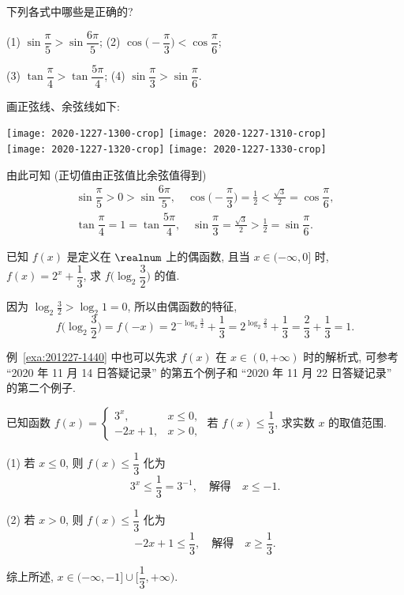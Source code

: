 \begin{example}
    下列各式中哪些是正确的?
    
    (1) $\sin\dfrac\pi5> \sin\dfrac{6\pi}5$;\quad 
    (2) $\cos\biggl(-\dfrac\pi3\biggr)< \cos\dfrac\pi6$;
    
    (3) $\tan\dfrac\pi4> \tan\dfrac{5\pi}4$;\quad 
    (4) $\sin\dfrac\pi3> \sin\dfrac\pi6$.
\end{example}
\begin{solution}
    画正弦线、余弦线如下:
    
    \begin{center}
        \texttt{[image: 2020-1227-1300-crop]}\qquad
        \texttt{[image: 2020-1227-1310-crop]}\\[5pt]
        \texttt{[image: 2020-1227-1320-crop]}\qquad
        \texttt{[image: 2020-1227-1330-crop]}
    \end{center}
    
    由此可知 (正切值由正弦值比余弦值得到)
    \[\begin{gathered}
        \sin\dfrac\pi5>0> \sin\dfrac{6\pi}5,\quad 
        \cos\biggl(-\dfrac\pi3\biggr)=\frac12< \frac{\sqrt3}2=\cos\dfrac\pi6,\\
        \tan\dfrac\pi4= 1= \tan\dfrac{5\pi}4,\quad 
        \sin\dfrac\pi3= \frac{\sqrt{3}}2> \frac12=\sin\dfrac\pi6.
    \end{gathered}\]
\end{solution}

\begin{example}\label{exa:201227-1440}
    已知 $f(x)$ 是定义在 $\realnum$ 上的偶函数, 且当 $x\in(-\infty,0]$ 时, $f(x)=2^x+\dfrac13$, 求 $f\biggl(\log_2 \dfrac32\biggr)$ 的值.
\end{example}
\begin{solution}
    因为 $\log_2 \frac32>\log_2 1=0$, 所以由偶函数的特征,
    \[f\biggl(\log_2 \frac32\biggr)= f(-x)
        = 2^{-\log_2 \frac32}+\frac13
        = 2^{\log_2 \frac23}+\frac13
        = \frac23+\frac13= 1.\]
\end{solution}

例~\ref{exa:201227-1440} 中也可以先求 $f(x)$ 在 $x\in(0,+\infty)$ 时的解析式, 可参考 ``2020 年 11 月 14 日答疑记录'' 的第五个例子和 ``2020 年 11 月 22 日答疑记录'' 的第二个例子. 

\begin{example}
    已知函数 $f(x) =\begin{cases}
        3^x, & x\leqslant 0,\\
        -2x+1, & x>0,
    \end{cases}$ 若 $f(x)\leqslant \dfrac13$, 求实数 $x$ 的取值范围.
\end{example}
\begin{solution}
    (1) 若 $x\leqslant 0$, 则 $f(x)\leqslant \dfrac13$ 化为
    \[3^x\leqslant \frac13= 3^{-1},\quad\text{解得}\quad
        x\leqslant -1.\]
    
    (2) 若 $x> 0$, 则 $f(x)\leqslant \dfrac13$ 化为
    \[-2x+1\leqslant \frac13,\quad\text{解得}\quad
        x\geqslant \frac13.\]
        
    综上所述, $x\in (-\infty,-1]\cup \biggl[\dfrac13,+\infty\biggr)$.
\end{solution}

